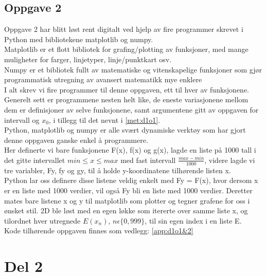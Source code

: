 \subsection{Oppgave 2}\label{met:d1o2}
Oppgave 2 har blitt løst rent digitalt ved hjelp av fire programmer skrevet i Python med bibliotekene matplotlib og numpy.\\
Matplotlib er et flott bibliotek for grafing/plotting av funksjoner, med mange muligheter for farger, linjetyper, linje/punktkart osv.\\Numpy er et bibliotek fullt av matematiske og vitenskapelige funksjoner som gjør programmatisk utregning av avansert matematikk mye enklere\\ I alt skrev vi fire programmer til denne oppgaven, ett til hver av funksjonene. Generelt sett er programmene nesten helt like, de eneste variasjonene mellom dem er definisjoner av selve funksjonene, samt argumentene gitt av oppgaven for intervall og $x_{0}$, i tillegg til det nevnt i \ref{met:d1o1}.\\[5mm]
Python, matplotlib og numpy er alle svært dynamiske verktøy som har gjort denne oppgaven ganske enkel å programmere.\\
Her definerte vi bare funksjonene F(x), f(x) og g(x), lagde en liste på 1000 tall i det gitte intervallet $min\leq x \leq max$ med fast intervall $\frac{max-min}{1000}$, videre lagde vi tre variabler, Fy, fy og gy, til å holde y-koordinatene tilhørende listen x.\\Python lar oss definere disse listene veldig enkelt med Fy = F(x), hvor dersom x er en liste med 1000 verdier, vil også Fy bli en liste med 1000 verdier. Deretter mates bare listene x og y til matplotlib som plotter og tegner grafene for oss i ønsket stil. 2D ble løst med en egen løkke som itererte over samme liste x, og tilordnet hver utregnede $E(x_{n})$, $n \epsilon \{0,999\}$, til sin egen index i en liste E.\\
Kode tilhørende oppgaven finnes som vedlegg: \ref{app:d1o1&2}

\section{Del 2}
